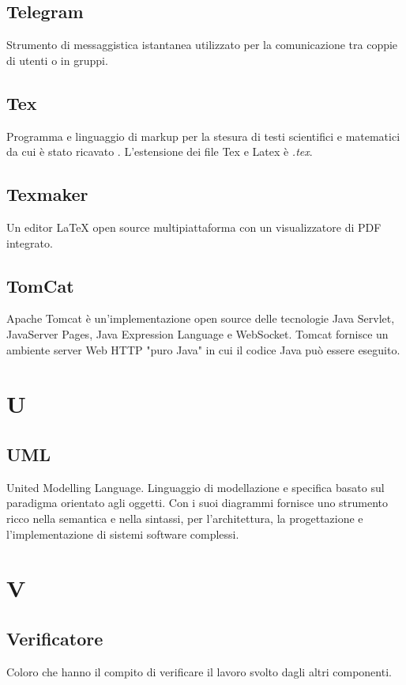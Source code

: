 \subsection*{Telegram}
Strumento di messaggistica istantanea utilizzato per la comunicazione tra coppie di utenti o in gruppi.

\subsection*{Tex}
Programma e linguaggio di markup per la stesura di testi scientifici e matematici da cui è stato ricavato . L'estensione dei file Tex e Latex è \textit{.tex}.

\subsection*{Texmaker}
Un editor LaTeX open source multipiattaforma con un visualizzatore di PDF integrato.

\subsection*{TomCat}
Apache Tomcat è un'implementazione open source delle tecnologie Java Servlet, JavaServer Pages, Java Expression Language e WebSocket. Tomcat fornisce un ambiente server Web HTTP "puro Java" in cui il codice Java può essere eseguito.

\section*{U}

\subsection*{UML}
United Modelling Language. Linguaggio di modellazione e specifica basato sul paradigma orientato agli oggetti. Con i suoi diagrammi fornisce uno strumento  ricco nella semantica e nella sintassi, per l'architettura, la progettazione e l'implementazione di sistemi software complessi.

\section*{V}
\subsection*{Verificatore}
Coloro che hanno il compito di verificare il lavoro svolto dagli altri componenti.

